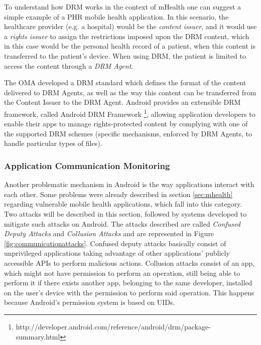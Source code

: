 To understand how \ac{DRM} works in the context of mHealth one can suggest a simple example of a \ac{PHR} mobile health application. In this scenario, the healthcare provider (e.g. a hospital) would be the \emph{content issuer}, and it would use a \emph{rights issuer} to assign the restrictions imposed upon the \ac{DRM} content, which in this case would be the personal health record of a patient, when this content is transferred to the patient's device. When using \ac{DRM}, the patient is limited to access the content through a \emph{\ac{DRM} Agent}.

The \ac{OMA} developed a DRM standard \cite{drm} which defines the format of the content delivered to DRM Agents, as well as the way this content can be transferred from the Content Issuer to the DRM Agent. Android provides an extensible DRM framework, called Android DRM Framework \footnote{http://developer.android.com/reference/android/drm/package-summary.html}, allowing application developers to enable their apps to manage rights-protected content by complying with one of the supported DRM schemes (specific mechanisms, enforced by DRM Agents, to handle particular types of files).

\subsubsection{Application Communication Monitoring}

Another problematic mechanism in Android is the way applications interact with each other. Some problems were already described in section \ref{sec:mhealth} regarding vulnerable mobile health applications, which fall into this category. Two attacks will be described in this section, followed by systems developed to mitigate such attacks on Android. The attacks described are called \emph{Confused Deputy Attacks} and \emph{Collusion Attacks} and are represented in Figure \ref{fig:communicationattacks}. Confused deputy attacks basically consist of unprivileged applications taking advantage of other applications’ publicly accessible APIs to perform malicious actions. Collusion attacks consist of an app, which might not have permission to perform an operation, still being able to perform it if there exists another app, belonging to the same developer, installed on the user’s device with the permission to perform said operation. This happens because Android’s permission system is based on UIDs.

